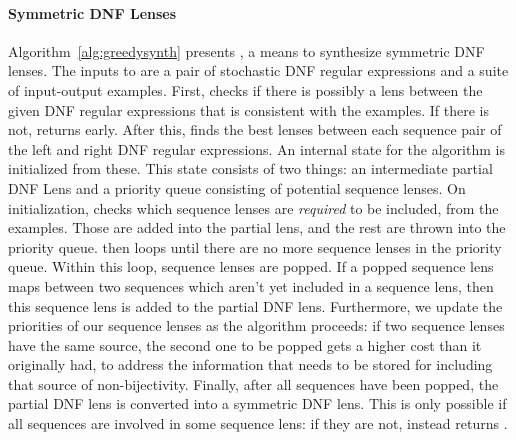 \documentclass[acmsmall,screen,anonymous]{acmart}
\begin{document}
\paragraph*{Symmetric DNF Lenses} Algorithm~\ref{alg:greedysynth} presents
\GreedySynth, a means to synthesize symmetric DNF lenses. The inputs to
\GreedySynth are a pair of stochastic DNF regular expressions and a suite of
input-output examples. First,  checks if there is possibly a lens
between the given DNF regular expressions that is consistent with the examples.
If there is not, \GreedySynth returns \None early. After this, \GreedySynth
finds the best lenses between each sequence pair of the left and right DNF
regular expressions. An internal state for the algorithm is initialized from
these. This state consists of two things: an intermediate partial DNF Lens and a
priority queue consisting of potential sequence lenses. On initialization,
\GreedySynth checks which sequence lenses are \emph{required} to be included,
from the examples. Those are added into the partial lens, and the rest are
thrown into the priority queue.
\GreedySynth then loops until there are no more sequence lenses in the priority
queue. Within this loop, sequence lenses are popped. If a popped sequence lens
maps between two sequences which aren't yet included in a sequence lens, then
this sequence lens is added to the partial DNF lens. Furthermore, we update the
priorities of our sequence lenses as the algorithm proceeds: if two sequence
lenses have the same source, the second one to be popped gets a higher cost than
it originally had, to address the information that needs to be stored for
including that source of non-bijectivity. Finally, after all sequences have been
popped, the partial DNF lens is converted into a symmetric DNF lens. This
is only possible if all sequences are involved in some sequence lens: if they
are not,  instead returns \None.
\end{document}
